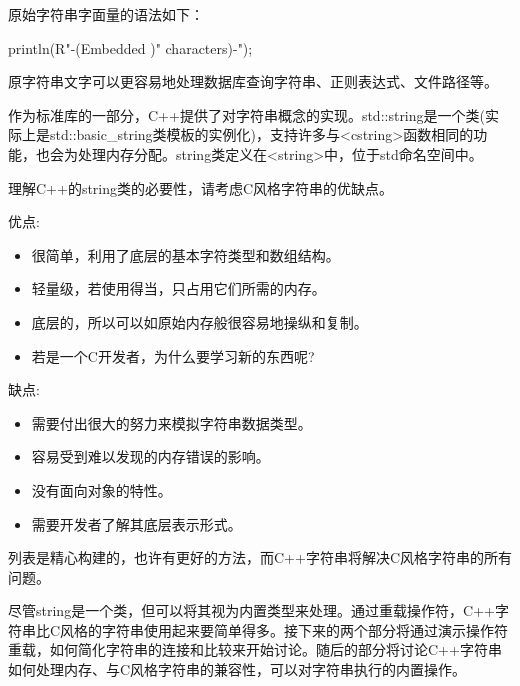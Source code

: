 原始字符串字面量的语法如下：

\begin{cpp}
println(R"-(Embedded )" characters)-");
\end{cpp}

原字符串文字可以更容易地处理数据库查询字符串、正则表达式、文件路径等。


作为标准库的一部分，C++提供了对字符串概念的实现。std::string是一个类(实际上是std::basic\_string类模板的实例化)，支持许多与<cstring>函数相同的功能，也会为处理内存分配。string类定义在<string>中，位于std命名空间中。


理解C++的string类的必要性，请考虑C风格字符串的优缺点。

优点:

\begin{itemize}
\item
很简单，利用了底层的基本字符类型和数组结构。

\item
轻量级，若使用得当，只占用它们所需的内存。

\item
底层的，所以可以如原始内存般很容易地操纵和复制。

\item
若是一个C开发者，为什么要学习新的东西呢?
\end{itemize}

缺点:

\begin{itemize}
\item
需要付出很大的努力来模拟字符串数据类型。

\item
容易受到难以发现的内存错误的影响。

\item
没有面向对象的特性。

\item
需要开发者了解其底层表示形式。
\end{itemize}

列表是精心构建的，也许有更好的方法，而C++字符串将解决C风格字符串的所有问题。


尽管string是一个类，但可以将其视为内置类型来处理。通过重载操作符，C++字符串比C风格的字符串使用起来要简单得多。接下来的两个部分将通过演示操作符重载，如何简化字符串的连接和比较来开始讨论。随后的部分将讨论C++字符串如何处理内存、与C风格字符串的兼容性，可以对字符串执行的内置操作。

